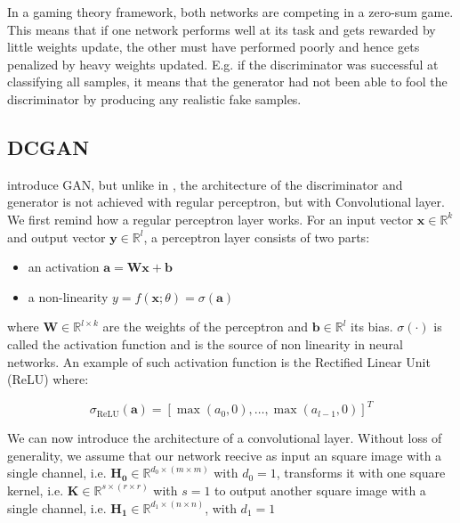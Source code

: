 \documentclass{article}
\begin{document}
In a gaming theory framework, both networks are competing in a zero-sum game. This means that if one network performs well at its task and gets rewarded by little weights update, the other must have performed poorly and hence gets penalized by heavy weights updated. E.g. if the discriminator was successful at classifying all samples, it means that the generator had not been able to fool the discriminator by producing any realistic fake samples.  


\subsection{DCGAN}

\cite{radford2015unsupervised} introduce GAN, but unlike in \cite{goodfellow2020generative}, the architecture of the discriminator and generator is not achieved with regular perceptron, but with Convolutional layer. We first remind how a regular perceptron layer works. For an input vector $\mathbf{x} \in \mathbb{R}^k$ and output vector $\mathbf{y} \in \mathbb{R}^l$, a perceptron layer consists of two parts:

\begin{itemize}
    \item an activation $\mathbf{a} = \mathbf{W} \mathbf{x} + \mathbf{b}$
    \item a non-linearity $y = f(\mathbf{x};\theta) = \sigma(\mathbf{a})$
\end{itemize}

where $\mathbf{W} \in \mathbb{R}^{l \times k}$ are the weights of the perceptron and $\mathbf{b} \in \mathbb{R}^l$ its bias. $\sigma(\cdot)$ is called the activation function and is the source of non linearity in neural networks. An example of such activation function is the Rectified Linear Unit (ReLU) where:

\begin{equation}
    \sigma_{\text{ReLU}}(\mathbf{a}) = [\max(a_0, 0), \dots, \max(a_{l-1}, 0)]^T
\end{equation}

We can now introduce the architecture of a convolutional layer. Without loss of generality, we assume that our network reecive as input an square image with a single channel, i.e. $\mathbf{H_0} \in \mathbb{R}^{d_0 \times (m \times m)}$ with $d_0 = 1$, transforms it with one square kernel, i.e. $\mathbf{K} \in \mathbb{R}^{s \times (r \times r)}$ with $s = 1$ to output another square image with a single channel, i.e. $\mathbf{H_1} \in \mathbb{R}^{d_1 \times (n \times n)}$, with $d_1 = 1$
\end{document}
